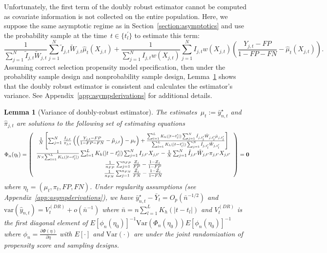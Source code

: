 \documentclass[11pt]{amsart}
\numberwithin{equation}{section}
\theoremstyle{plain}
\newtheorem{lemma}[theorem]{Lemma}
\begin{document}
 Unfortunately, the first term of the doubly robust estimator cannot be computed as covariate information is not collected on the entire population.  Here, we suppose the same asymptotic regime as in Section~\ref{section:asymptotics} and use the probability sample at the time~$t \in \{t_l^\prime\}$ to estimate this term:
 $$
 \frac{1}{\sum_{j=1}^N \tilde I_{j,t} \tilde W_{j,t}} \sum_{j=1}^N  \tilde I_{j,t} \tilde W_{j,t} \hat \mu_{t} (X_{j,t}) + \frac{1}{\sum_{j=1}^N I_{j,t} w (X_{j,t})} \sum_{j=1}^N I_{j,t} w(X_{j,t}) \left( \frac{Y_{j,t} - FP}{1 - FP - FN} - \hat \mu_t(X_{j,t}) \right).
 $$
 Assuming correct selection propensity model specification, then under the probability sample design and nonprobability sample design, Lemma~\ref{lemma:dr} shows that the doubly robust estimator is consistent and calculates the estimator's variance. See Appendix~\ref{app:asympderivations} for additional details.

 \begin{lemma}[Variance of doubly-robust estimator] \normalfont
 \label{lemma:dr}
 The estimates~$\mu_t := \bar y_{n,t}^\star$ and $\hat \pi_{j,t}$
 are solutions to the following set of estimating equations
 $$
 \Phi_n (\eta_t) =
 \left (
 \begin{array}{c}
 \frac{1}{N} \left[ \sum_{j=1}^N \frac{I_{j,t}}{\pi_{j,t}} \left( \left( \frac{Y_{j,t} - FP}{1-FP-FN} - \hat \mu_{j,t}  \right)  - \mu_t \right) + \frac{\sum_{l=1}^L K_{h} (|t - t_l^\prime|) \sum_{j=1}^N \tilde I_{j,t_l^\prime} \tilde W_{j,t_l^\prime} \hat \mu_{j,t_l^\prime}}{\sum_{l=1}^L K_{h} (|t - t_l^\prime|) \sum_{j=1}^N \tilde I_{j,t_l^\prime} \tilde W_{j,t_l^\prime}} \right] \\
 \frac{1}{N \times \sum_{l=1}^L K_{h} (|t - t_l^\prime|)} \sum_{l=1}^L K_{h} (|t - t_l^\prime|) \sum_{j=1}^N I_{j,t^\prime} X_{j,t^\prime} - \frac{1}{N} \sum_{j = 1}^N \tilde I_{j,t^\prime} \tilde W_{j,t^\prime}  \pi_{j,t^\prime} X_{j,t^\prime}  \\
 \frac{1}{n_{FP}} \sum_{j=1}^{n_{FP}} \frac{Z_j}{FP} - \frac{1-Z_j}{1-FP} \\
 \frac{1}{n_{FN}} \sum_{j=1}^{n_{FN}} \frac{\tilde Z_j}{FN} - \frac{1-\tilde Z_j}{1-FN} \\
 \end{array}
 \right ) = {\bf 0}
 $$
 where $\eta_t = (\mu_t, \pi_t, FP, FN)$. Under regularity assumptions (see Appendix~\ref{app:asympderivations}), we have $\bar y_{n,t}^\star - \bar Y_{t} = O_p (\bar n^{-1/2})$ and $\text{var} (\hat y_{n,t}) = V_{t}^{(DR)} + o (\bar n^{-1})$ where $\bar n = n \sum_{l=1}^L K_h(|t-t_l|)$ and $V_t^{(DR)}$ is the first diagonal element of $E [\phi_n(\eta_0)]^{-1} \text{Var}(\Phi_n(\eta_0))E [\phi_n(\eta_0)]^{-1}$ where $\phi_n = \frac{\partial \Phi (\eta)}{\partial \eta}$ with $E[\cdot]$ and $\text{Var} (\cdot)$ are under the joint randomization of propensity score and sampling designs.
 \end{lemma}
\end{document}
